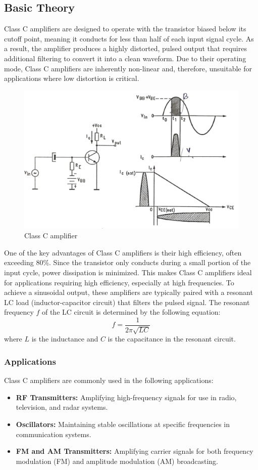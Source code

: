 \documentclass[12pt,a4paper]{article}
\begin{document}
   \subsection{Basic Theory}
    Class C amplifiers are designed to operate with the transistor biased below its cutoff point, meaning it conducts for less than half of each input signal cycle. As a result, the amplifier produces a highly distorted, pulsed output that requires additional filtering to convert it into a clean waveform. Due to their operating mode, Class C amplifiers are inherently non-linear and, therefore, unsuitable for applications where low distortion is critical.

    \begin{figure}[H]
        \centering
        \includegraphics[width=0.5\linewidth]{analogue1_1.jpeg}
        \caption{Class C amplifier}
        \label{fig:B32.1}
    \end{figure}

    One of the key advantages of Class C amplifiers is their high efficiency, often exceeding 80\%. Since the transistor only conducts during a small portion of the input cycle, power dissipation is minimized. This makes Class C amplifiers ideal for applications requiring high efficiency, especially at high frequencies. To achieve a sinusoidal output, these amplifiers are typically paired with a resonant LC load (inductor-capacitor circuit) that filters the pulsed signal. The resonant frequency \( f \) of the LC circuit is determined by the following equation:
    \[
    f = \frac{1}{2 \pi \sqrt{LC}}
    \]
    where \( L \) is the inductance and \( C \) is the capacitance in the resonant circuit.

    \subsubsection{Applications}
    Class C amplifiers are commonly used in the following applications:
    \begin{itemize}
        \item \textbf{RF Transmitters:} Amplifying high-frequency signals for use in radio, television, and radar systems.
        \item \textbf{Oscillators:} Maintaining stable oscillations at specific frequencies in communication systems.
        \item \textbf{FM and AM Transmitters:} Amplifying carrier signals for both frequency modulation (FM) and amplitude modulation (AM) broadcasting.
    \end{itemize}
\end{document}
